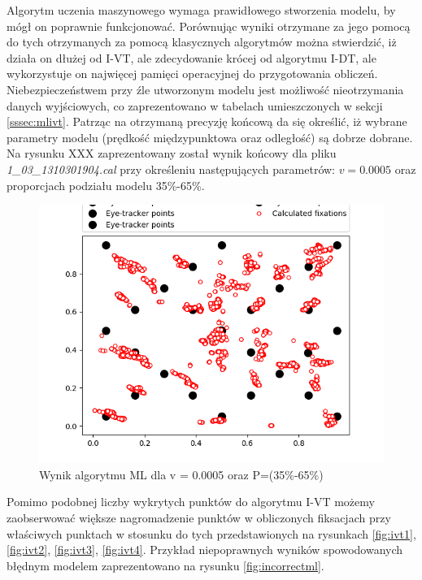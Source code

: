 Algorytm uczenia maszynowego wymaga prawidłowego stworzenia modelu, by mógł on poprawnie funkcjonować. Porównując wyniki otrzymane za jego pomocą do tych otrzymanych za pomocą klasycznych algorytmów można stwierdzić, iż działa on dłużej od I-VT, ale zdecydowanie krócej od algorytmu I-DT, ale wykorzystuje on najwięcej pamięci operacyjnej do przygotowania obliczeń. Niebezpieczeństwem przy źle utworzonym modelu jest możliwość nieotrzymania danych wyjściowych, co zaprezentowano w tabelach umieszczonych w sekcji \ref{sssec:mlivt}. Patrząc na otrzymaną precyzję końcową da się określić, iż wybrane parametry modelu (prędkość międzypunktowa oraz odległość) są dobrze dobrane. Na rysunku XXX zaprezentowany został wynik końcowy dla pliku \emph{1\_03\_1310301904.cal} przy określeniu następujących parametrów: $v = 0.0005$ oraz proporcjach podziału modelu 35\%-65\%.
\begin{figure}[H]
    \centering
    \captionsetup{justification=centering,margin=2cm}
    \includegraphics[width=0.8\linewidth]{resources/ml-result.png}
    \caption{Wynik algorytmu ML dla v = 0.0005 oraz P=(35\%-65\%)}
    \label{fig:mlresult}
\end{figure}
Pomimo podobnej liczby wykrytych punktów do algorytmu I-VT możemy zaobserwować większe nagromadzenie punktów w obliczonych fiksacjach przy właściwych punktach w stosunku do tych przedstawionych na rysunkach \ref{fig:ivt1}, \ref{fig:ivt2}, \ref{fig:ivt3}, \ref{fig:ivt4}. Przykład niepoprawnych wyników spowodowanych błędnym modelem zaprezentowano na rysunku \ref{fig:incorrectml}.
